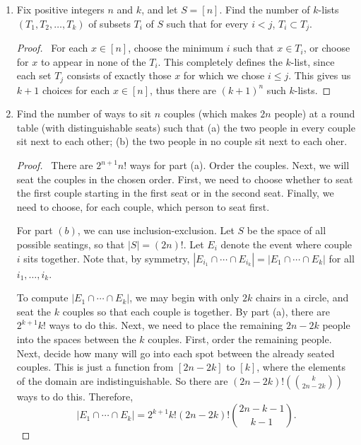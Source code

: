 \documentclass[12pt]{article}
\begin{document}
\begin{enumerate}[leftmargin=0cm,itemindent=.5cm,labelwidth=\itemindent,labelsep=0cm,align=left]
\begin{enumerate}
\begin{proof}
\begin{align*}
a_n = \dfrac{(2n)!}{2^n n!}
&\sim
\dfrac{\sqrt{2\pi 2n} \left( \frac{2n}{e} \right)^{2n}}{2^n \sqrt{2\pi n} \left( \frac{n}{e} \right)^n}
=
\frac{\sqrt{2}}{2^n} \cdot \frac{2^{2n} \left( \frac{n}{e} \right)^n \left( \frac{n}{e} \right)^n}{\left( \frac{n}{e} \right)^n}
\\
&= \sqrt{2} \cdot 2^n \left( \frac{n}{e} \right)^n = \sqrt{2} \left( \frac{2}{e} \right)^n n^n < \sqrt{2} \cdot n^n.
\end{align*}
So $a_n = O(n^n)$.
\end{proof}
\end{enumerate}
\item Fix positive integers $n$ and $k$, and let $S = [n]$.  Find the number of $k$-lists $(T_1, T_2, \dots, T_k)$ of subsets $T_i$ of $S$ such that for every $i < j$, $T_i \subset T_j$.

\begin{proof}
\ For each $x \in [n]$, choose the minimum $i$ such that $x \in T_i$, or choose for $x$ to appear in none of the $T_i$.  This completely defines the $k$-list, since each set $T_j$ consists of exactly those $x$ for which we chose $i \leq j$.  This gives us $k+1$ choices for each $x \in [n]$, thus there are $(k+1)^n$ such $k$-lists.
\end{proof}

\item Find the number of ways to sit $n$ couples (which makes $2n$ people) at a round table (with distinguishable seats) such that (a) the two people in every couple sit next to each other; (b) the two people in no couple sit next to each oher.

\begin{proof}
\ There are $2^{n+1}n!$ ways for part (a).  Order the couples.  Next, we will seat the couples in the chosen order.  First, we need to choose whether to seat the first couple starting in the first seat or in the second seat.  Finally, we need to choose, for each couple, which person to seat first.

For part $(b)$, we can use inclusion-exclusion.  Let $S$ be the space of all possible seatings, so that $|S| = (2n)!$.  Let $E_i$ denote the event where couple $i$ sits together.  Note that, by symmetry, $|E_{i_1} \cap \cdots \cap E_{i_k}| = |E_1 \cap \cdots \cap E_k|$ for all $i_1, \dots, i_k$.

To compute $|E_1 \cap \cdots \cap E_k|$, we may begin with only $2k$ chairs in a circle, and seat the $k$ couples so that each couple is together.  By part (a), there are $2^{k+1}k!$ ways to do this.  Next, we need to place the remaining $2n - 2k$ people into the spaces between the $k$ couples.  First, order the remaining people.  Next, decide how many will go into each spot between the already seated couples.  This is just a function from $[2n-2k]$ to $[k]$, where the elements of the domain are indistinguishable.  So there are $(2n-2k)! \left( \binom{k}{2n-2k} \right)$ ways to do this.  Therefore,
$$|E_1 \cap \cdots \cap E_k| = 2^{k+1}k!(2n-2k)! \binom{2n-k-1}{k-1}.$$


\end{proof}
\end{enumerate}
\end{document}
